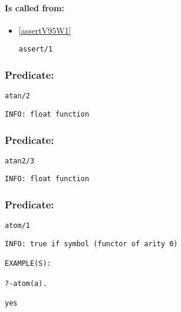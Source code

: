 \paragraph{Is called from:} 
\begin{itemize}
\item \ref{assertV95W1} 
\begin{verbatim}
assert/1
\end{verbatim}

\end{itemize}

\subsubsection{Predicate:} \label{atanV95W2}

\begin{verbatim}
atan/2
\end{verbatim}

{\small \begin{verbatim}
INFO: float function

\end{verbatim}}

\subsubsection{Predicate:} \label{atan2V95W3}

\begin{verbatim}
atan2/3
\end{verbatim}

{\small \begin{verbatim}
INFO: float function

\end{verbatim}}

\subsubsection{Predicate:} \label{atomV95W1}

\begin{verbatim}
atom/1
\end{verbatim}

{\small \begin{verbatim}
INFO: true if symbol (functor of arity 0)

EXAMPLE(S):

?-atom(a).

yes

\end{verbatim}}

